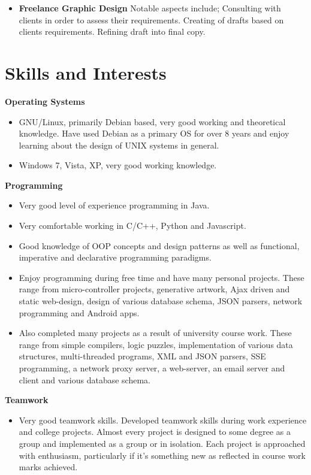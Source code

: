 \documentclass{res}
\begin{document}
\begin{resume}
\begin{itemize}
    \item{{\bf Freelance Graphic Design}} Notable aspects include; Consulting with clients in order to assess their requirements. Creating of drafts based on clients requirements. Refining draft into final copy.
  \end{itemize}
    
 


     
\section{Skills and Interests} 
\renewcommand{\labelitemi}{$\bullet$}
\vspace{0.1in}
 {\bf Operating Systems}
    \begin{itemize} %
      \item GNU/Linux, primarily Debian based, very good working and theoretical knowledge. Have used Debian as a primary OS for over 8 years and enjoy learning about the design of UNIX systems in general.
      \item Windows 7, Vista, XP, very good working knowledge.
      \end{itemize}
{\bf Programming} 
       \begin{itemize}
        \item Very good level of experience programming in Java. 
        \item Very comfortable working in C/C++, Python and Javascript. 
        \item Good knowledge of OOP concepts and design patterns as well as functional, imperative and declarative programming paradigms. 
        \item Enjoy programming during free time and have many personal projects. These range from micro-controller projects, generative artwork, Ajax driven and static web-design, design of various database schema, JSON parsers, network programming and Android apps.
        \item Also completed many projects as a result of university course work. These range from simple compilers, logic puzzles, implementation of various data structures, multi-threaded programs, XML and JSON parsers, SSE programming, a network proxy server, a web-server, an email server and client and various database schema.
    \end{itemize}

    {\bf  Teamwork} 
        \begin{itemize}
        \item  Very good teamwork skills. Developed teamwork skills during work experience and college projects. Almost every project is designed to some degree as a group and implemented as a group or in isolation. Each project is approached with enthusiasm, particularly if it's something new as reflected in course work marks achieved.
       \end{itemize} 


\end{resume}
\end{document}
